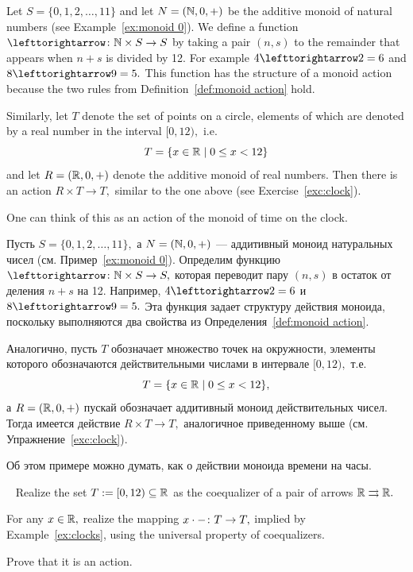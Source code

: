 \documentclass[CT4S-EN-RU]{subfiles}
\begin{document}
\begin{exampleENG}\label{ex:clocks}
Let $S=\{0,1,2,\ldots,11\}$ and let $N=({\mathbb N},0,+)$ be the additive monoid of natural numbers (see Example~\ref{ex:monoid 0}).  We define a function $\acts\taking\NN\times S\to S$ by taking a pair $(n,s)$ to the remainder that appears when $n+s$ is divided by 12. For example $4\acts 2=6$ and $8\acts 9 = 5.$ This function has the structure of a monoid action because the two rules from Definition~\ref{def:monoid action} hold.

Similarly, let $T$ denote the set of points on a circle, elements of which are denoted by a real number in the interval $[0,12),$ i.e. $$T=\{x\in{\mathbb R}{\;|\;}0\leq x< 12\}$$ and let $R=({\mathbb R},0,+)$ denote the additive monoid of real numbers. Then there is an action $R\times T\to T,$ similar to the one above (see Exercise~\ref{exc:clock}).

One can think of this as an action of the monoid of time on the clock.
\end{exampleENG}

\begin{exampleRUS}\label{ex:clocks}
Пусть $S=\{0,1,2,\ldots,11\},$ а $N=({\mathbb N},0,+)$ — аддитивный моноид натуральных чисел (см. Пример~\ref{ex:monoid 0}). Определим функцию $\acts\taking\NN\times S\to S,$ которая переводит пару $(n,s)$ в остаток от деления $n+s$ на 12. Например, $4\acts 2=6$ и $8\acts 9 = 5.$ Эта функция задает структуру действия моноида, поскольку выполняются два свойства из Определения~\ref{def:monoid action}.

Аналогично, пусть $T$ обозначает множество точек на окружности, элементы которого обозначаются действительными числами в интервале $[0,12),$ т.е. $$T=\{x\in{\mathbb R}{\;|\;}0\leq x< 12\},$$ а $R=({\mathbb R},0,+)$ пускай обозначает аддитивный моноид действительных чисел. Тогда имеется действие $R\times T\to T,$ аналогичное приведенному выше (см. Упражнение~\ref{exc:clock}).

Об этом примере можно думать, как о действии моноида времени на часы.
\end{exampleRUS}

\begin{exerciseENG}\label{exc:clock}~
\sexc Realize the set $T:=[0,12)\subseteq{\mathbb R}$ as the coequalizer of a pair of arrows ${\mathbb R}\rightrightarrows{\mathbb R}.$
\item For any $x\in{\mathbb R},$ realize the mapping $x\cdot-\colon T\rightarrow T,$ implied by Example~\ref{ex:clocks}, using the universal property of coequalizers.
\item Prove that it is an action.
\endsexc
\end{exerciseENG}
\end{document}
